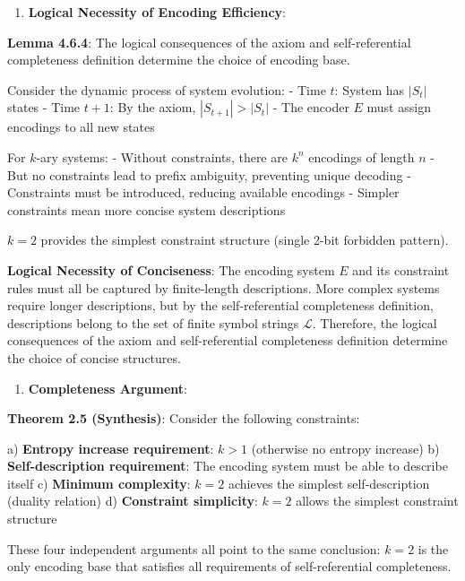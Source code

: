 \begin{enumerate}
\item \textbf{Logical Necessity of Encoding Efficiency}:
\end{enumerate}
   
   \textbf{Lemma 4.6.4}: The logical consequences of the axiom and self-referential completeness definition determine the choice of encoding base.
\label{thm:2.5}
   
   Consider the dynamic process of system evolution:
   - Time $t$: System has $|S_t|$ states
   - Time $t+1$: By the axiom, $|S_{t+1}| > |S_t|$
   - The encoder $E$ must assign encodings to all new states
   
   For $k$-ary systems:
   - Without constraints, there are $k^n$ encodings of length $n$
   - But no constraints lead to prefix ambiguity, preventing unique decoding
   - Constraints must be introduced, reducing available encodings
   - Simpler constraints mean more concise system descriptions
   
   $k=2$ provides the simplest constraint structure (single 2-bit forbidden pattern).
   
   \textbf{Logical Necessity of Conciseness}: The encoding system $E$ and its constraint rules must all be captured by finite-length descriptions. More complex systems require longer descriptions, but by the self-referential completeness definition, descriptions belong to the set of finite symbol strings $\mathcal{L}$. Therefore, the logical consequences of the axiom and self-referential completeness definition determine the choice of concise structures.
   
\begin{enumerate}
\item \textbf{Completeness Argument}:
\end{enumerate}
   
   \textbf{Theorem 2.5 (Synthesis)}: Consider the following constraints:
   
   a) \textbf{Entropy increase requirement}: $k > 1$ (otherwise no entropy increase)
   b) \textbf{Self-description requirement}: The encoding system must be able to describe itself
   c) \textbf{Minimum complexity}: $k=2$ achieves the simplest self-description (duality relation)
   d) \textbf{Constraint simplicity}: $k=2$ allows the simplest constraint structure
   
   These four independent arguments all point to the same conclusion: $k=2$ is the only encoding base that satisfies all requirements of self-referential completeness.
   
